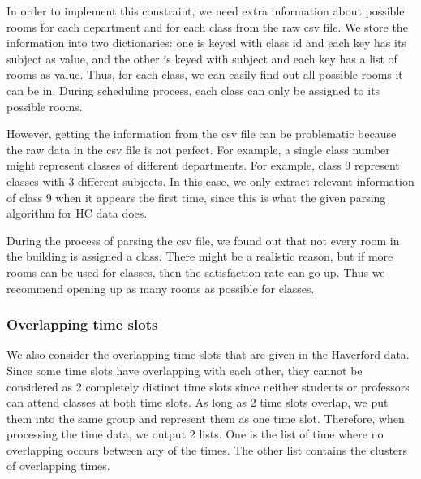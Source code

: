 \documentclass[11pt, oneside]{article}   	%
\begin{document}
In order to implement this constraint, we need extra information about possible rooms for each department and for each class from the raw csv file.
We store the information into two dictionaries: one is keyed with class id and each key has its subject as value, and the other is keyed with subject and each key has a list of rooms as value. Thus, for each class, we can easily find out all possible rooms it can be in.
During scheduling process, each class can only be assigned to its possible rooms. 

However, getting the information from the csv file can be problematic because the raw data in the csv file is not perfect. For example, a single class number might represent classes of different departments.
For example, class 9 represent classes with 3 different subjects. 
In this case, we only extract relevant information of class 9 when it appears the first time, since this is what the given parsing algorithm for HC data does.

During the process of parsing the csv file, we found out that not every room in the building is assigned a class. There might be a realistic reason, but if more rooms can be used for classes, then the satisfaction rate can go up. Thus we recommend opening up as many rooms as possible for classes. 


\subsubsection{Overlapping time slots}
We also consider the overlapping time slots that are given in the Haverford data. Since some time slots have overlapping with each other, they cannot be considered as 2 completely distinct time slots since neither students or professors can attend classes at both time slots. As long as 2 time slots overlap, we put them into the same group and represent them as one time slot. Therefore, when processing the time data, we output 2 lists. One is the list of time where no overlapping occurs between any of the times. The other list contains the clusters of overlapping times.
\end{document}
